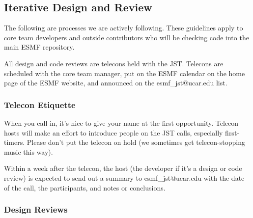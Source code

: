 \subsection{Iterative Design and Review}

The following are processes we are actively following.  These
guidelines apply to core team developers and outside contributors
who will be checking code into the main ESMF repository.

All design and code reviews are telecons held with the JST. 
Telecons are scheduled with the core team manager, put on the ESMF
calendar on the home page of the ESMF website, and announced on the
esmf\_jst@ucar.edu list.

\subsubsection{Telecon Etiquette}

When you call in, it's nice to give your name at the first opportunity.
Telecon hosts will make an effort to introduce people on the JST calls,
especially first-timers. Please don't put the telecon on hold (we sometimes
get telecon-stopping music this way).

Within a week after the telecon, the host (the developer if it's a design
or code review) is expected to send out a summary to esmf\_jst@ucar.edu
with the date of the call, the participants, and notes or conclusions.

\subsubsection{Design Reviews}

